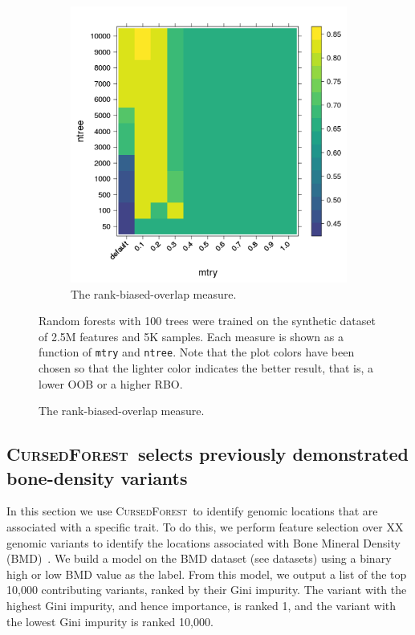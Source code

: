 \documentclass[10pt,letterpaper]{article}
\newcommand{\cursedforest}{\textsc{CursedForest}\xspace}
\newcommand{\mtry}{\texttt{mtry}\xspace}
\newcommand{\ntree}{\texttt{ntree}\xspace}
\begin{document}
\begin{figure}[tbhp]
\begin{adjustwidth}{-1.00in}{0in}
    \begin{subfigure}[b]{0.5\linewidth}
      \centering
      \includegraphics[totalheight=8cm]{./figs/rbo_levleplot.png}
      \caption{The rank-biased-overlap measure.} 
      \label{figure:rbo-prod.png} 
      \vspace{4ex}
    \end{subfigure} 
    \begin{flushleft} 
      Random forests with 100 trees were trained on the synthetic dataset of 2.5M features and 5K samples.
      Each measure is shown as a function of \mtry and \ntree. Note that the plot colors have been chosen so that the lighter color indicates
      the better result, that is, a lower OOB or a higher RBO.
    \end{flushleft}
  \end{adjustwidth}
\end{figure}

\subsection{\cursedforest\ selects previously demonstrated bone-density variants}
In this section we use \cursedforest\ to identify genomic locations that are associated with a specific trait. To do this, we perform feature selection over XX genomic variants to 
identify the locations associated with Bone Mineral Density (BMD)~\cite{Duncan.2011}. We build a
model on the BMD dataset (see datasets) using a binary high or low BMD value as the label.  From this model, we output a
list of the top 10,000 contributing variants, ranked by their Gini impurity. The variant with the highest Gini impurity,
and hence importance, is ranked 1, and the variant with the lowest Gini impurity is ranked 10,000.  
\end{document}
